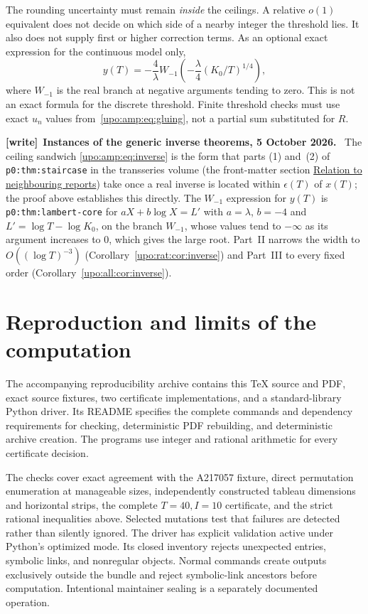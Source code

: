 \documentclass[11pt,letterpaper]{article}
\theoremstyle{remark}\newtheorem{remark}[theorem]{Remark}
\numberwithin{equation}{section}
\newenvironment{writenote}[1][]{\par\smallskip\begingroup\small
 \noindent\textbf{[write]}\if\relax\detokenize{#1}\relax\else~\textbf{#1.}\fi\ }%
 {\par\endgroup\smallskip}
\begin{document}
The rounding uncertainty must remain \emph{inside} the ceilings. A
relative $o(1)$ equivalent does not decide on which side of a nearby
integer the threshold lies. It also does not supply first or higher
correction terms. As an optional exact expression for the continuous
model only,
\[
y(T)=-\frac4\lambda
W_{-1}\!\left(-\frac\lambda4(K_0/T)^{1/4}\right),
\]
where $W_{-1}$ is the real branch at negative arguments tending to zero.
This is not an exact formula for the discrete threshold. Finite threshold
checks must use exact $u_n$ values from~\eqref{upo:amp:eq:gluing}, not a partial
sum substituted for $R$.
\begin{writenote}[Instances of the generic inverse theorems, 5 October 2026]
The ceiling sandwich \eqref{upo:amp:eq:inverse} is the form that parts (1) and~(2) of \texttt{p0:thm:staircase} in the transseries volume (the front-matter section \hyperref[upo:sec:neighbours]{Relation to neighbouring reports}) take once a real inverse is located within $\epsilon(T)$ of $x(T)$; the proof above establishes this directly. The $W_{-1}$ expression for $y(T)$ is \texttt{p0:thm:lambert-core} for $aX+b\log X=L'$ with $a=\lambda$, $b=-4$ and $L'=\log T-\log K_0$, on the branch $W_{-1}$, whose values tend to $-\infty$ as its argument increases to $0$, which gives the large root. Part~II narrows the width to $O((\log T)^{-3})$ (Corollary~\ref{upo:rat:cor:inverse}) and Part~III to every fixed order (Corollary~\ref{upo:all:cor:inverse}).
\end{writenote}

\section{Reproduction and limits of the computation}\label{upo:amp:sec:reproduction}
The accompanying reproducibility archive contains this TeX source and
PDF, exact source fixtures, two certificate implementations, and a
standard-library Python driver. Its README specifies the complete commands
and dependency requirements for checking, deterministic PDF rebuilding, and
deterministic archive creation. The programs use integer and rational
arithmetic for every certificate decision.

The checks cover exact agreement with the A217057 fixture, direct
permutation enumeration at manageable sizes, independently constructed
tableau dimensions and horizontal strips, the complete $T=40,I=10$
certificate, and the strict rational inequalities above. Selected
mutations test that failures are detected rather than silently ignored.
The driver has explicit validation active under Python's optimized
mode. Its closed inventory rejects unexpected entries, symbolic links,
and nonregular objects. Normal commands create outputs exclusively
outside the bundle and reject symbolic-link ancestors before computation.
Intentional maintainer sealing is a separately documented operation.
\end{document}
